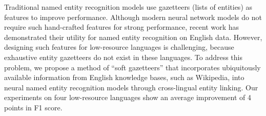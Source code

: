 Traditional named entity recognition models use gazetteers (lists of entities) as features to improve performance. Although modern neural network models do not require such hand-crafted features for strong performance, recent work has demonstrated their utility for named entity recognition on English data. However, designing such features for low-resource languages is challenging, because exhaustive entity gazetteers do not exist in these languages. To address this problem, we propose a method of ``soft gazetteers'' that incorporates ubiquitously available information from English knowledge bases, such as Wikipedia, into neural named entity recognition models through cross-lingual entity linking. Our experiments on four low-resource languages show an average improvement of 4 points in F1 score.
